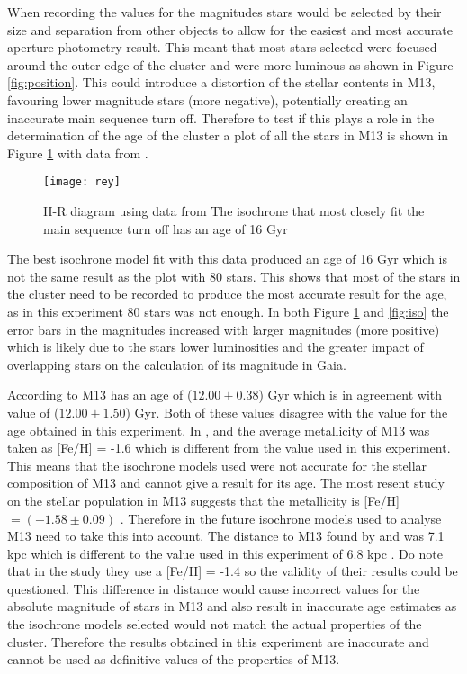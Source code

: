 \documentclass[10pt]{article}
\begin{document}
When recording the values for the magnitudes stars would be selected by their size and separation from other objects to allow for the easiest and most accurate aperture photometry result. This meant that most stars selected were focused around the outer edge of the cluster and were more luminous as shown in Figure \ref{fig:position}. This could introduce a distortion of the stellar contents in M13, favouring lower magnitude stars (more negative), potentially creating an inaccurate main sequence turn off. Therefore to test if this plays a role in the determination of the age of the cluster a plot of all the stars in M13 is shown in Figure \ref{fig:reydata} with data from \citet{Rey_2001}.
\begin{figure}[h]
	\centering
	\texttt{[image: rey]}
	\caption{H-R diagram using data from \citet{Rey_2001} The isochrone that most closely fit the main sequence turn off has an age of 16 Gyr}
	\label{fig:reydata}
\end{figure}

The best isochrone model fit with this data produced an age of 16 Gyr which is not the same result as the plot with 80 stars. This shows that most of the stars in the cluster need to be recorded to produce the most accurate result for the age, as in this experiment 80 stars was not enough. In both Figure \ref{fig:reydata} and \ref{fig:iso} the error bars in the magnitudes increased with larger magnitudes (more positive) which is likely due to the stars lower luminosities and the greater impact of overlapping stars on the calculation of its magnitude in Gaia.

According to \citet{VandenBerg_2013} M13 has an age of ($12.00 \pm 0.38$) Gyr which is in agreement with \citet{Grundahl_1998} value of ($12.00 \pm 1.50$) Gyr. Both of these values disagree with the value for the age obtained in this experiment. In \citet{VandenBerg_2013}, \citet{Grundahl_1998} and \citet{Rey_2001} the average metallicity of M13 was taken as [Fe/H] = -1.6 which is different from the value used in this experiment. This means that the isochrone models used were not accurate for the stellar composition of M13 and cannot give a result for its age. The most resent study on the stellar population in M13 suggests that the metallicity is [Fe/H] $=(-1.58 \pm 0.09)$ \citep{deras}. Therefore in the future isochrone models used to analyse M13 need to take this into account. The distance to M13 found by \citet{deras} and \citet{buckley} was 7.1 kpc which is different to the value used in this experiment of 6.8 kpc \citep{Paust_2010}. Do note that in the \citet{buckley} study they use a [Fe/H] = -1.4 so the validity of their results could be questioned. This difference in distance would cause incorrect values for the absolute magnitude of stars in M13 and also result in inaccurate age estimates as the isochrone models selected would not match the actual properties of the cluster. Therefore the results obtained in this experiment are inaccurate and cannot be used as definitive values of the properties of M13.
\end{document}
